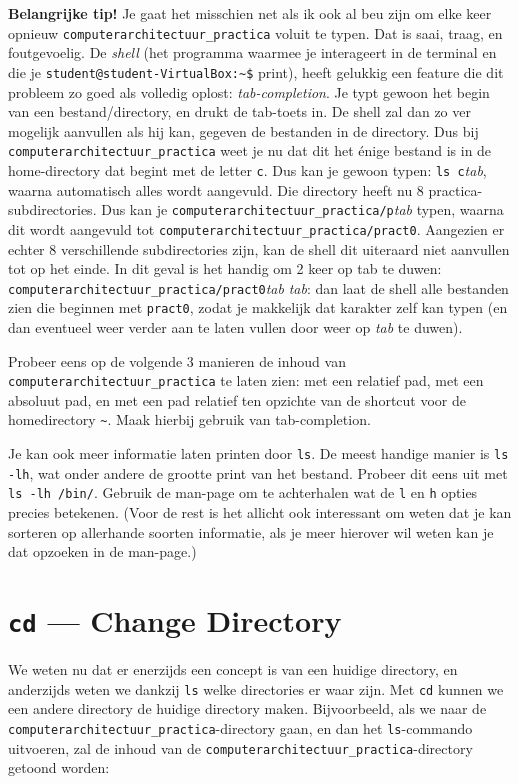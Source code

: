 \documentclass[a4paper,twoside,openany]{memoir}
\begin{document}
\textbf{Belangrijke tip!} Je gaat het misschien net als ik ook al beu zijn om elke keer opnieuw \verb!computerarchitectuur_practica! voluit te typen. Dat is saai, traag, en foutgevoelig. De \emph{shell} (het programma waarmee je interageert in de terminal en die je \verb!student@student-VirtualBox:~$! print), heeft gelukkig een feature die dit probleem zo goed als volledig oplost: \emph{tab-completion}. Je typt gewoon het begin van een bestand/directory, en drukt de tab-toets in. De shell zal dan zo ver mogelijk aanvullen als hij kan, gegeven de bestanden in de directory. Dus bij \verb!computerarchitectuur_practica! weet je nu dat dit het \'enige bestand is in de home-directory dat begint met de letter \verb!c!. Dus kan je gewoon typen: \verb!ls c!\emph{tab}, waarna automatisch alles wordt aangevuld. Die directory heeft nu 8 practica-subdirectories. Dus kan je \verb!computerarchitectuur_practica/p!\emph{tab} typen, waarna dit wordt aangevuld tot \verb!computerarchitectuur_practica/pract0!. Aangezien er echter 8 verschillende subdirectories zijn, kan de shell dit uiteraard niet aanvullen tot op het einde. In dit geval is het handig om 2 keer op tab te duwen:
\verb!computerarchitectuur_practica/pract0!\emph{tab} \emph{tab}: dan laat de shell alle bestanden zien die beginnen met \verb!pract0!, zodat je makkelijk dat karakter zelf kan typen (en dan eventueel weer verder aan te laten vullen door weer op \emph{tab} te duwen).

Probeer eens op de volgende 3 manieren de inhoud van \verb!computerarchitectuur_practica! te laten zien: met een relatief pad, met een absoluut pad, en met een pad relatief ten opzichte van de shortcut voor de homedirectory \verb!~!. Maak hierbij gebruik van tab-completion.

Je kan ook meer informatie laten printen door \verb!ls!. De meest handige manier is \verb!ls -lh!, wat onder andere de grootte print van het bestand. Probeer dit eens uit met \verb!ls -lh /bin/!. Gebruik de man-page om te achterhalen wat de \verb!l! en \verb!h! opties precies betekenen. (Voor de rest is het allicht ook interessant om weten dat je kan sorteren op allerhande soorten informatie, als je meer hierover wil weten kan je dat opzoeken in de man-page.)

\section{\texttt{cd} --- Change Directory}

We weten nu dat er enerzijds een concept is van een huidige directory, en anderzijds weten we dankzij \verb!ls! welke directories er waar zijn. Met \verb!cd! kunnen we een andere directory de huidige directory maken. Bijvoorbeeld, als we naar de \verb!computerarchitectuur_practica!-directory gaan, en dan het \verb!ls!-commando uitvoeren, zal de inhoud van de \verb!computerarchitectuur_practica!-directory getoond worden:
\end{document}
